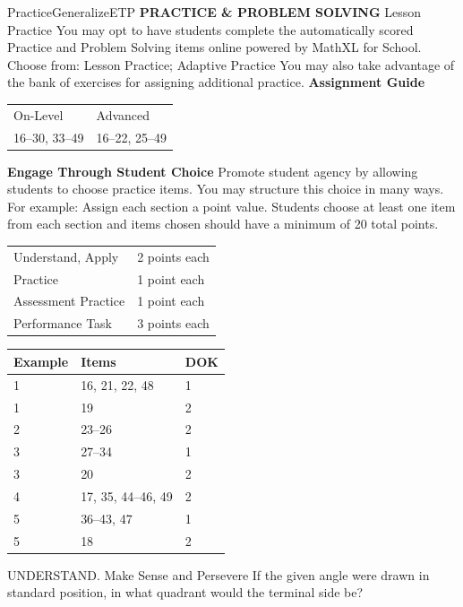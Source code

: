 \documentclass{article}
\newenvironment{item-analysis}{}{}      %
\newenvironment{practice}[2]{}{}        %
\newenvironment{te-addendum}[2]{}{}     %
\newcommand{\answer}[1]{}               %
\newcommand{\placeholder}[2]{}          %
\newcommand{\te}[1]{}                   %
\begin{document}
\begin{te-addendum}{Practice}{GeneralizeETP}
\textbf{PRACTICE & PROBLEM SOLVING}
Lesson Practice You may opt to have students complete the automatically scored Practice and Problem Solving items online powered by MathXL for School.
Choose from: Lesson Practice; Adaptive Practice
You may also take advantage of the bank of exercises for assigning additional practice.
\textbf{Assignment Guide}
\begin{tabular}{ll}
On-Level & Advanced \\
16--30, 33--49 & 16--22, 25--49 \\
\end{tabular}
\textbf{Engage Through Student Choice}
Promote student agency by allowing students to choose practice items. You may structure this choice in many ways. For example:
Assign each section a point value. Students choose at least one item from each section and items chosen should have a minimum of 20 total points.
\begin{tabular}{ll}
Understand, Apply & 2 points each \\
Practice & 1 point each \\
Assessment Practice & 1 point each \\
Performance Task & 3 points each \\
\end{tabular}
\te{Practice & Problem Solving and video tutorials are available at SavvasRealize.com. Scan the QR code to access a video tutorial.}
\end{te-addendum}
\begin{item-analysis}
\begin{tabular}{lll}
\toprule
Example & Items & DOK \\
\midrule
1 & 16, 21, 22, 48 & 1 \\
1 & 19 & 2 \\
2 & 23--26 & 2 \\
3 & 27--34 & 1 \\
3 & 20 & 2 \\
4 & 17, 35, 44--46, 49 & 2 \\
5 & 36--43, 47 & 1 \\
5 & 18 & 2 \\
\bottomrule
\end{tabular}
\end{item-analysis}
\begin{practice}{16}{1}
UNDERSTAND. Make Sense and Persevere If the given angle were drawn in standard position, in what quadrant would the terminal side be?
\placeholder{graph}{Black x,y axes with arrows, no ticks. Two blue rays from origin into II and III. Upper ray60° from positive y; lower ray20° from negative y. Blue angle arc joins the two rays through negative x.}
\answer{Quadrant II}
\end{practice}
\end{document}
